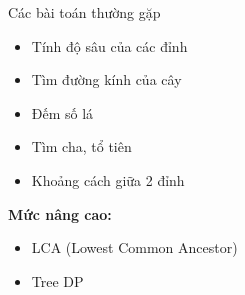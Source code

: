 \begin{frame}{Các bài toán thường gặp}

\begin{itemize}
\item Tính độ sâu của các đỉnh
\item Tìm đường kính của cây
\item Đếm số lá
\item Tìm cha, tổ tiên
\item Khoảng cách giữa 2 đỉnh
\end{itemize}

\vspace{0.4cm}

\textbf{Mức nâng cao:}
\begin{itemize}
\item LCA (Lowest Common Ancestor)
\item Tree DP
\end{itemize}

\end{frame}